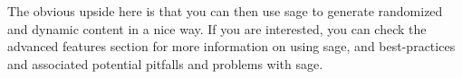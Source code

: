\documentclass{ximera}
\begin{document}
    The obvious upside here is that you can then use sage to generate randomized and dynamic content in a nice way. If you are interested, you can check the advanced features section for more information on using sage, and best-practices and associated potential pitfalls and problems with sage.
    
\end{document}
